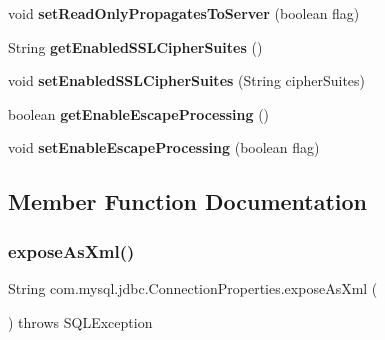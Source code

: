 \begin{DoxyCompactItemize}
void {\bfseries set\+Read\+Only\+Propagates\+To\+Server} (boolean flag)
\item 
\mbox{\label{interfacecom_1_1mysql_1_1jdbc_1_1_connection_properties_a8004f865a2289af96a884e06ae3fcf6e}} 
String {\bfseries get\+Enabled\+S\+S\+L\+Cipher\+Suites} ()
\item 
\mbox{\label{interfacecom_1_1mysql_1_1jdbc_1_1_connection_properties_adb7e5de3bc8a98fcc742a14f265dbc7a}} 
void {\bfseries set\+Enabled\+S\+S\+L\+Cipher\+Suites} (String cipher\+Suites)
\item 
\mbox{\label{interfacecom_1_1mysql_1_1jdbc_1_1_connection_properties_a44c0d14cebcc967dcb224e9f99628bfe}} 
boolean {\bfseries get\+Enable\+Escape\+Processing} ()
\item 
\mbox{\label{interfacecom_1_1mysql_1_1jdbc_1_1_connection_properties_a46aaad36bcec69bae45fc34d402dfd00}} 
void {\bfseries set\+Enable\+Escape\+Processing} (boolean flag)
\end{DoxyCompactItemize}


\subsection{Member Function Documentation}
\mbox{\label{interfacecom_1_1mysql_1_1jdbc_1_1_connection_properties_a73482b2a70021a34f84dbc38bf1a105a}} 
\subsubsection{\texorpdfstring{expose\+As\+Xml()}{exposeAsXml()}}
{\footnotesize\ttfamily String com.\+mysql.\+jdbc.\+Connection\+Properties.\+expose\+As\+Xml (\begin{DoxyParamCaption}{ }\end{DoxyParamCaption}) throws S\+Q\+L\+Exception}

